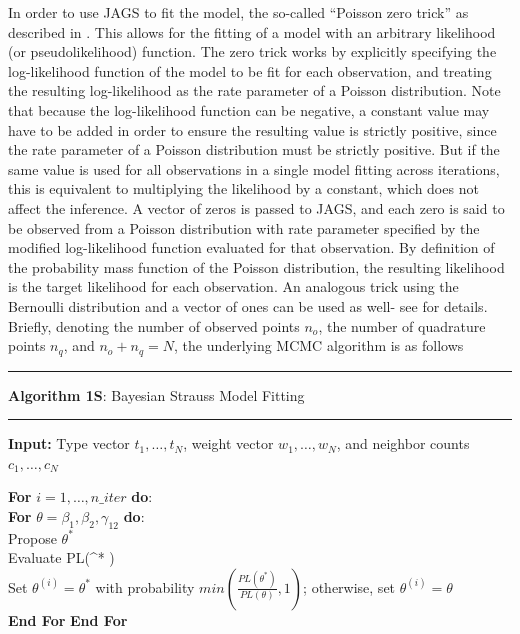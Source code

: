 \documentclass[
]{book}
\begin{document}
In order to use JAGS to fit the model, the so-called ``Poisson zero trick'' as described in \citet{Kruschke14}. This allows for the fitting of a model with an arbitrary likelihood (or pseudolikelihood) function. The zero trick works by explicitly specifying the log-likelihood function of the model to be fit for each observation, and treating the resulting log-likelihood as the rate parameter of a Poisson distribution. Note that because the log-likelihood function can be negative, a constant value may have to be added in order to ensure the resulting value is strictly positive, since the rate parameter of a Poisson distribution must be strictly positive. But if the same value is used for all observations in a single model fitting across iterations, this is equivalent to multiplying the likelihood by a constant, which does not affect the inference. A vector of zeros is passed to JAGS, and each zero is said to be observed from a Poisson distribution with rate parameter specified by the modified log-likelihood function evaluated for that observation. By definition of the probability mass function of the Poisson distribution, the resulting likelihood is the target likelihood for each observation. An analogous trick using the Bernoulli distribution and a vector of ones can be used as well- see \citet{Kruschke14} for details. Briefly, denoting the number of observed points \(n_o\), the number of quadrature points \(n_q\), and \(n_o + n_q = N\), the underlying MCMC algorithm is as follows

\begin{center}\rule{0.5\linewidth}{0.5pt}\end{center}

\textbf{Algorithm 1S}: Bayesian Strauss Model Fitting

\begin{center}\rule{0.5\linewidth}{0.5pt}\end{center}

\textbf{Input:} Type vector \(t_1, \dots, t_N\), weight vector \(w_1, \dots, w_N\), and neighbor counts \(c_1, \dots, c_N\)

\textbf{For} \(i = 1, \dots, n\_iter\) \textbf{do}:\\
\textbar{} \textbf{For} \(\theta = \beta_1, \beta_2, \gamma_{12}\) \textbf{do}:\\
\textbar{} \textbar{} Propose \(\theta^*\)\\
\textbar{} \textbar{} Evaluate PL(\theta\^{}* \textbar{} \cdot )\\
\textbar{} \textbar{} Set \(\theta^{(i)} = \theta^*\) with probability \(min(\frac{PL(\theta^*)}{PL(\theta)}, 1)\); otherwise, set \(\theta^{(i)} = \theta\)\\
\textbar{} \textbf{End For}
\textbf{End For}
\end{document}
